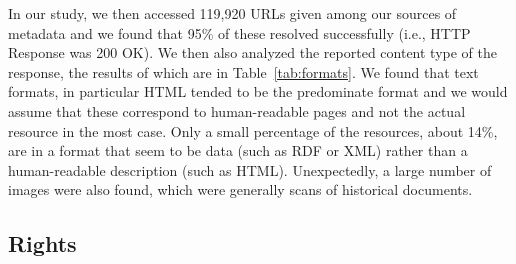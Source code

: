 \documentclass[smallextended]{svjour3}       %
\begin{document}
In our study, we then accessed 119,920 URLs given among our sources of metadata
and we found that 95\% of these resolved successfully (i.e., HTTP Response was
200 OK). We then also analyzed the reported content type of the response, the
results of which are in Table~\ref{tab:formats}. We found that text formats, in
particular HTML tended to be the predominate format and we would assume that
these correspond to human-readable pages and not the actual resource in the most
case. Only a small percentage of the resources, about 14\%, are in a format that
seem to be data (such as RDF or XML) rather than a human-readable description
(such as HTML). Unexpectedly, a large number of
images were also found, which were generally scans of historical documents.

\subsection{Rights}
\end{document}
